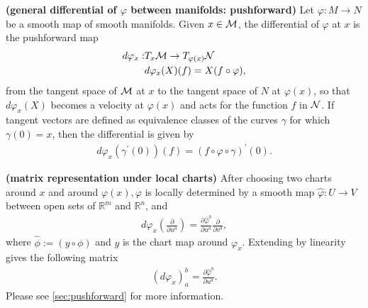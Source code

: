 \documentclass[12pt]{article} %
\newcommand{\bfs}[1]{\textbf{({#1}) }}
\begin{document}
\begin{defa}\bfs{general differential of $\varphi$ between manifolds: pushforward}
Let $\varphi: M \rightarrow N$ be a smooth map of smooth manifolds. Given $x \in \mathcal{M}$, the differential of $\varphi$ at $x$ is the pushforward  map
\begin{align*}
d \varphi_{x}: &T_{x} \mathcal{M} \rightarrow T_{\varphi(x)} \mathcal{N}\\
&d \varphi_{x}(X)(f)=X(f \circ \varphi),
\end{align*}
from the tangent space of $\mathcal{M}$ at $x$ to the tangent space of $N$ at $\varphi(x)$, so that $d \varphi_{x}(X)$ becomes a velocity at $\varphi(x)$ and acts for the function $f$ in $\mathcal{N}$.
If tangent vectors are defined as equivalence classes of the curves $\gamma$ for which $\gamma(0)=x$, then the differential is given by
\begin{align*}
d \varphi_{x}\left(\gamma^{\prime}(0)\right)(f)=(f\circ \varphi \circ \gamma)^{\prime}(0) .
\end{align*}
\begin{rema}\bfs{matrix representation under local charts}
After choosing two charts around $x$ and around $\varphi(x), \varphi$ is locally determined by a smooth map $\widehat{\varphi}: U \rightarrow V$ between open sets of $\mathbb{R}^{m}$ and $\mathbb{R}^{n}$, and
\begin{align*}
d \varphi_{x}\left(\frac{\partial}{\partial u^{a}}\right)=\frac{\partial \widehat{\varphi}^{b}}{\partial u^{a}} \frac{\partial}{\partial v^{b}},
\end{align*}
where $\hat{\phi} := (y\circ\phi)$ and $y$ is the chart map around $\varphi_{x}$. Extending by linearity gives the following matrix
\begin{align*}
\left(d \varphi_{x}\right)_{a}^{b}=\frac{\partial \widehat{\varphi}^{b}}{\partial u^{a}} .
\end{align*}
Please see \cref{sec:pushforward} for more information.
\end{rema}

\end{defa}
\end{document}
